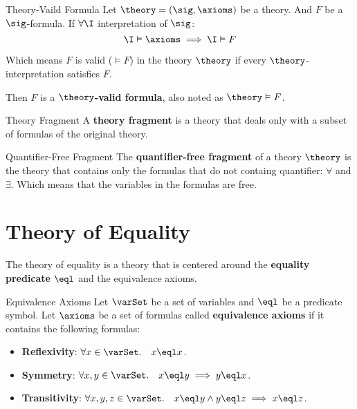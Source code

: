 \begin{definition}{Theory-Vaild Formula}
    Let $\theory = (\sig,\axioms)$ be a theory. And $F$ be a $\sig$-formula.
    If $\forall \I$ interpretation of $\sig$:
    \begin{equation*}
        \I \vDash \axioms \implies \I \vDash F
    \end{equation*}

    Which means $F$ is valid ($\vDash F$) in the theory $\theory$ if 
    every $\theory$-interpretation satisfies $F$.

    Then $F$ is a \textbf{$\theory$-valid formula}, also 
    noted as $\theory \vDash F$. 
\end{definition}

\begin{definition}{Theory Fragment}
    A \textbf{theory fragment} is a theory that deals only with a subset 
    of formulas of the original theory.
\end{definition}

\begin{definition}{Quantifier-Free Fragment}
    The \textbf{quantifier-free fragment} of a theory $\theory$ is the theory 
    that contains only the formulas that do not containg quantifier: 
    $\forall$ and $\exists$.
    Which means that the variables in the formulas are free.
\end{definition}

\section{Theory of Equality}
\label{sec:Theory of Equality}

The theory of equality is a theory that is centered around 
the \textbf{equality predicate} $\eql$ and the equivalence
axioms.

\begin{definition}{Equivalence Axioms}
    Let $\varSet$ be a set of variables and $\eql$ be a predicate symbol.
    Let $\axioms$ be a set of formulas called \textbf{equivalence axioms} if 
    it contains the following formulas:
    \begin{itemize}
        \item \textbf{Reflexivity}: $\forall x \in \varSet. \quad x \eql x$.
        \item \textbf{Symmetry}: $\forall x,y \in \varSet. \quad x \eql y \implies y \eql x$.
        \item \textbf{Transitivity}: 
        $\forall x,y,z \in \varSet. \quad x \eql y \land y \eql z \implies x \eql z$.
    \end{itemize}
\end{definition}

